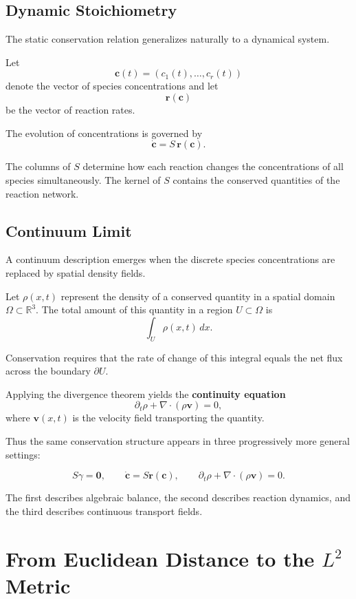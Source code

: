 \documentclass[11pt, openany]{book}
\theoremstyle{plain}
\theoremstyle{definition}
\theoremstyle{remark}
\begin{document}
\subsection*{Dynamic Stoichiometry}

The static conservation relation generalizes naturally to a dynamical
system.

Let
\[
\mathbf{c}(t)=(c_1(t),\dots,c_r(t))
\]
denote the vector of species concentrations and let
\[
\mathbf{r}(\mathbf{c})
\]
be the vector of reaction rates.

The evolution of concentrations is governed by
\[
\dot{\mathbf{c}}=S\,\mathbf{r}(\mathbf{c}).
\]

The columns of $S$ determine how each reaction changes the
concentrations of all species simultaneously.  The kernel of $S$
contains the conserved quantities of the reaction network.

\subsection*{Continuum Limit}

A continuum description emerges when the discrete species
concentrations are replaced by spatial density fields.

Let $\rho(x,t)$ represent the density of a conserved quantity in a
spatial domain $\Omega\subset\mathbb{R}^3$.  The total amount of this
quantity in a region $U\subset\Omega$ is
\[
\int_U \rho(x,t)\,dx.
\]

Conservation requires that the rate of change of this integral equals
the net flux across the boundary $\partial U$.

Applying the divergence theorem yields the
\textbf{continuity equation}
\[
\partial_t\rho+\nabla\cdot(\rho\mathbf{v})=0,
\]
where $\mathbf{v}(x,t)$ is the velocity field transporting the
quantity.

Thus the same conservation structure appears in three progressively
more general settings:

\[
S\gamma=\mathbf{0},
\qquad
\dot{\mathbf{c}}=S\mathbf{r}(\mathbf{c}),
\qquad
\partial_t\rho+\nabla\cdot(\rho\mathbf{v})=0.
\]

The first describes algebraic balance, the second describes reaction
dynamics, and the third describes continuous transport fields.

\section{From Euclidean Distance to the $L^2$ Metric}
\end{document}

